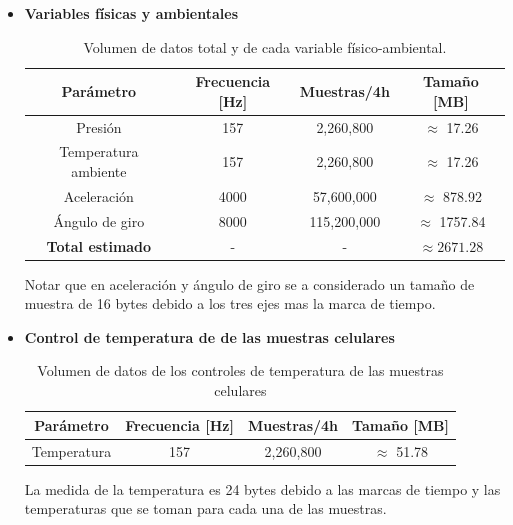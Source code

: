       \begin{itemize}

        \item \textbf{Variables físicas y ambientales}

        \begin{table}[H]
          \centering
          \begin{tabular}{|c|c|c|c|}
            \hline
            \textbf{Parámetro} & \textbf{Frecuencia [Hz]} & \textbf{Muestras/4h} & \textbf{Tamaño [MB]} \\
            \hline
            Presión               & 157   & 2,260,800  & $\approx$ 17.26     \\
            Temperatura ambiente  & 157   & 2,260,800  & $\approx$ 17.26     \\
            Aceleración           & 4000  & 57,600,000  & $\approx$ 878.92   \\
            Ángulo de giro        & 8000  & 115,200,000 & $\approx$ 1757.84   \\
            \hline
            \textbf{Total estimado} & -    & -         & $\boldsymbol{\approx 2671.28}$ \\
            \hline
          \end{tabular}
          \caption{Volumen de datos total y de cada variable físico-ambiental.}
          \label{tab:volumen_datos}
        \end{table}
        Notar que en aceleración y ángulo de giro se a considerado un tamaño de muestra de 16 bytes debido a los tres ejes mas la marca de tiempo.
        
        \item \textbf{Control de temperatura de de las muestras celulares}

        \begin{table}[H]
          \centering
          \begin{tabular}{|c|c|c|c|}
            \hline
            \textbf{Parámetro} & \textbf{Frecuencia [Hz]} & \textbf{Muestras/4h} & \textbf{Tamaño [MB]} \\
            \hline
            Temperatura & 157   & 2,260,800  & $\approx$ 51.78     \\ \hline
          \end{tabular}
          \caption{Volumen de datos de los controles de temperatura de las muestras celulares}
          \label{tab:volumen_datos_temperatura}
        \end{table}
        La medida de la temperatura es 24 bytes debido a las marcas de tiempo y las temperaturas que se toman para cada una de las muestras.


\end{itemize}
